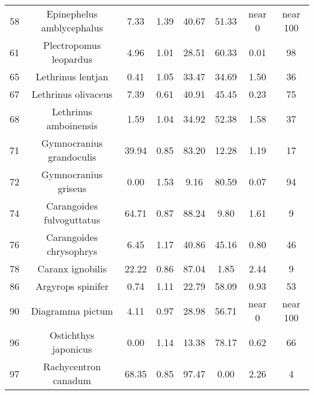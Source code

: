 \documentclass{report}\usepackage[]{graphicx}\usepackage[]{color}
\begin{document}
\begin{table}[ht]
{\begin{tabular}{cccccccc}
   58 & Epinephelus amblycephalus & 7.33 & 1.39 & 40.67 & 51.33 & near 0 & near 100 \\ 
   61 & Plectropomus leopardus & 4.96 & 1.01 & 28.51 & 60.33 & 0.01 & 98 \\ 
   65 & Lethrinus lentjan & 0.41 & 1.05 & 33.47 & 34.69 & 1.50 & 36 \\ 
   67 & Lethrinus olivaceus & 7.39 & 0.61 & 40.91 & 45.45 & 0.23 & 75 \\ 
   68 & Lethrinus amboinensis & 1.59 & 1.04 & 34.92 & 52.38 & 1.58 & 37 \\ 
   71 & Gymnocranius grandoculis & 39.94 & 0.85 & 83.20 & 12.28 & 1.19 & 17 \\ 
   72 & Gymnocranius griseus & 0.00 & 1.53 & 9.16 & 80.59 & 0.07 & 94 \\ 
   74 & Carangoides fulvoguttatus & 64.71 & 0.87 & 88.24 & 9.80 & 1.61 & 9 \\ 
   76 & Carangoides chrysophrys & 6.45 & 1.17 & 40.86 & 45.16 & 0.80 & 46 \\ 
   78 & Caranx ignobilis & 22.22 & 0.86 & 87.04 & 1.85 & 2.44 & 9 \\ 
   86 & Argyrops spinifer & 0.74 & 1.11 & 22.79 & 58.09 & 0.93 & 53 \\ 
   90 & Diagramma pictum & 4.11 & 0.97 & 28.98 & 56.71 & near 0 & near 100 \\ 
   96 & Ostichthys japonicus & 0.00 & 1.14 & 13.38 & 78.17 & 0.62 & 66 \\ 
   97 & Rachycentron canadum & 68.35 & 0.85 & 97.47 & 0.00 & 2.26 & 4 \\ 
   \hline
\end{tabular}
}
\end{table}

\clearpage
\newpage
\end{document}
